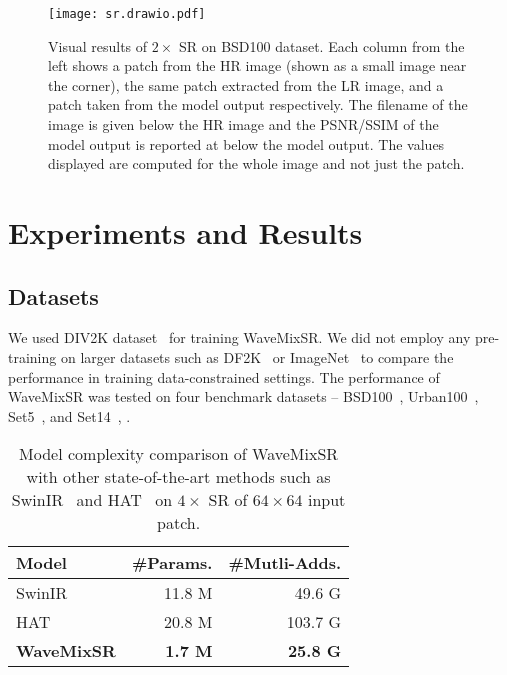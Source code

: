 \documentclass{article}
\begin{document}
\begin{figure}[!b]
\centering
\texttt{[image: sr.drawio.pdf]}
\caption{Visual results of $2\times$ SR on BSD100 dataset. Each column from the left shows a patch from the HR image (shown as a small image near the corner), the same patch extracted from the LR image, and a patch taken from the model output respectively. The filename of the image is given below the HR image and the PSNR/SSIM of the model output is reported at below the model output. The values displayed are computed for the whole image and not just the patch.}
\label{fig:images}
\end{figure}



\section{Experiments and Results}

\subsection{Datasets}

We used DIV2K dataset~\cite{8014884} for training WaveMixSR. We did not employ any pre-training on larger datasets such as DF2K~\cite{8014884} or ImageNet~\cite{5206848} to compare the performance in training data-constrained settings. The performance of WaveMixSR was tested on four benchmark datasets -- BSD100~\cite{937655}, Urban100~\cite{7299156}, Set5~\cite{BMVC.26.135}, and Set14~\cite{10.1007/978-3-642-27413-8_47}, .


\begin{table}[]
\centering
\begin{tabular}{@{}lrr@{}}
\toprule
Model & \#Params. & \#Mutli-Adds. \\ \midrule
SwinIR~\cite{liang2021swinir} & 11.8 M & 49.6 G \\
HAT~\cite{chen2023activating} & 20.8 M & 103.7 G \\
\textbf{WaveMixSR} & \textbf{1.7 M} & \textbf{25.8 G} \\ \bottomrule
\end{tabular}
\vspace{2mm}
\caption{Model complexity comparison of WaveMixSR with other state-of-the-art methods such as SwinIR~\cite{liang2021swinir} and HAT~\cite{chen2023activating} on $4\times$ SR of $64\times64$ input patch.}
\label{tab:param}
\end{table}
\end{document}
